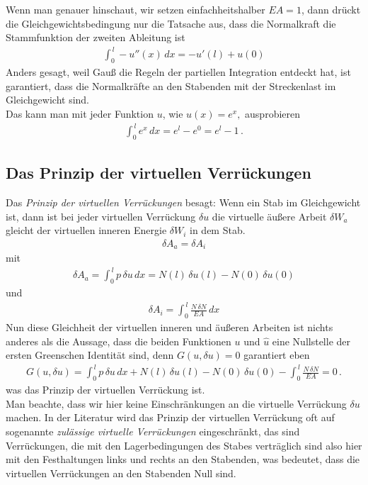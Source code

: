 Wenn man genauer hinschaut, wir setzen einfachheitshalber $EA = 1$, dann dr\"{u}ckt die Gleichgewichtsbedingung nur die Tatsache aus, dass die Normalkraft die Stammfunktion der zweiten Ableitung ist
\begin{align}
\int_0^{\,l} - u''(x)\,dx = - u'(l) + u(0)
\end{align}
Anders gesagt, weil Gau{\ss} die Regeln der partiellen Integration entdeckt hat, ist garantiert, dass die Normalkr\"{a}fte an den Stabenden mit der Streckenlast im Gleichgewicht sind. \\

Das kann man mit jeder Funktion $u$, wie $u(x) = e^x,$ ausprobieren
\begin{align}
\int_0^{\,l} e^x\,dx = e^l - e^0 = e^l  - 1\,.
\end{align}
\subsection{Das Prinzip der virtuellen Verr\"{u}ckungen}
Das {\em Prinzip der virtuellen Verr\"{u}ckungen\/} besagt: Wenn ein Stab im Gleichgewicht ist, dann ist bei jeder virtuellen Verr\"{u}ckung $ \delta u $ die virtuelle \"{a}u{\ss}ere Arbeit $ \delta W_a $ gleicht der virtuellen inneren Energie $\delta W_i$ in dem Stab.
\begin{align}
\delta A_a = \delta A_i
\end{align}
mit
\begin{align}
\delta A_a = \int_0^{\,l} p\,\delta u\,dx = N(l)\, \delta u(l) - N(0)\,\delta u(0)
\end{align}
und
\begin{align}
\delta A_i = \int_0^{\,l} \frac{N\,\delta N}{EA}\,dx
\end{align}
Nun diese Gleichheit der virtuellen inneren und \"{a}u{\ss}eren Arbeiten ist nichts anderes als die Aussage, dass die beiden Funktionen $ u $ und $\hat{u}$ eine Nullstelle der ersten Greenschen Identit\"{a}t sind, denn $G(u,\delta u) = 0$ garantiert eben
\begin{align} \label{Eq1}
G(u,\delta u) = \int_0^{\,l} p\,\delta u\,dx + N(l)\,\delta u(l) - N(0)\,\delta u(0)  - \int_0^{\,l} \frac{N\,\delta N}{EA}= 0\,.
\end{align}
was das Prinzip der virtuellen Verr\"{u}ckung ist.\\

Man beachte, dass wir hier keine Einschr\"{a}nkungen an die virtuelle Verr\"{u}ckung $ \delta u $ machen. In der Literatur wird das Prinzip der virtuellen Verr\"{u}ckung oft auf sogenannte {\em zul\"{a}ssige virtuelle Verr\"{u}ckungen\/} eingeschr\"{a}nkt, das sind Verr\"{u}ckungen, die mit den Lagerbedingungen des Stabes vertr\"{a}glich sind also hier mit den Festhaltungen links und rechts an den Stabenden, was bedeutet, dass die virtuellen Verr\"{u}ckungen an den Stabenden Null sind. \\

